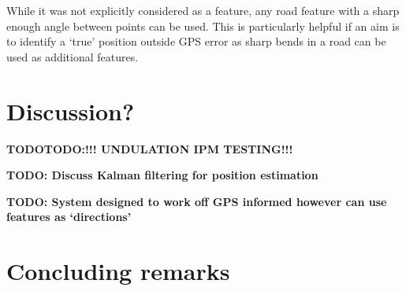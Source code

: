 \documentclass[]{aiaa-tc}%
\begin{document}
While it was not explicitly considered as a feature, any road feature with a sharp enough angle between points can be used. This is particularly helpful if an aim is to identify a `true' position outside GPS error as sharp bends in a road can be used as additional features.

\section{ Discussion?}
\textbf{TODOTODO:!!! UNDULATION IPM TESTING!!!}

\textbf{TODO: Discuss Kalman filtering for position estimation}

\textbf{TODO: System designed to work off GPS informed however can use features as `directions'}

\section{Concluding remarks}
\end{document}
